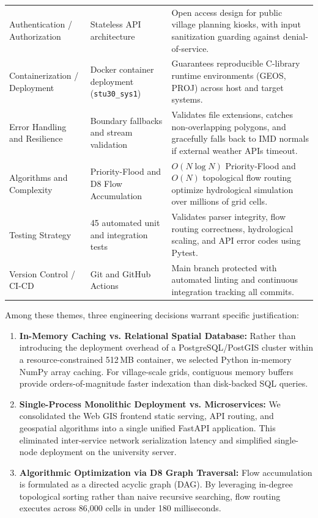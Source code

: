 \documentclass[manuscript,screen,review]{acmart}
\begin{document}
\begin{table}[t]
\begin{tabular}{p{3.2cm}p{5.5cm}p{6.8cm}}
    Authentication / Authorization & Stateless API architecture & Open access design for public village planning kiosks, with input sanitization guarding against denial-of-service. \\
    Containerization / Deployment & Docker container deployment (\texttt{stu30\_sys1}) & Guarantees reproducible C-library runtime environments (GEOS, PROJ) across host and target systems. \\
    Error Handling and Resilience & Boundary fallbacks and stream validation & Validates file extensions, catches non-overlapping polygons, and gracefully falls back to IMD normals if external weather APIs timeout. \\
    Algorithms and Complexity & Priority-Flood and D8 Flow Accumulation & $O(N \log N)$ Priority-Flood and $O(N)$ topological flow routing optimize hydrological simulation over millions of grid cells. \\
    Testing Strategy & 45 automated unit and integration tests & Validates parser integrity, flow routing correctness, hydrological scaling, and API error codes using Pytest. \\
    Version Control / CI-CD & Git and GitHub Actions & Main branch protected with automated linting and continuous integration tracking all commits. \\
    \bottomrule
  \end{tabular}
\end{table}

Among these themes, three engineering decisions warrant specific justification:
\begin{enumerate}
    \item \textbf{In-Memory Caching vs. Relational Spatial Database:} Rather than introducing the deployment overhead of a PostgreSQL/PostGIS cluster within a resource-constrained 512\,MB container, we selected Python in-memory NumPy array caching. For village-scale grids, contiguous memory buffers provide orders-of-magnitude faster indexation than disk-backed SQL queries.
    \item \textbf{Single-Process Monolithic Deployment vs. Microservices:} We consolidated the Web GIS frontend static serving, API routing, and geospatial algorithms into a single unified FastAPI application. This eliminated inter-service network serialization latency and simplified single-node deployment on the university server.
    \item \textbf{Algorithmic Optimization via D8 Graph Traversal:} Flow accumulation is formulated as a directed acyclic graph (DAG). By leveraging in-degree topological sorting rather than naive recursive searching, flow routing executes across 86,000 cells in under 180 milliseconds.
\end{enumerate}
\end{document}

